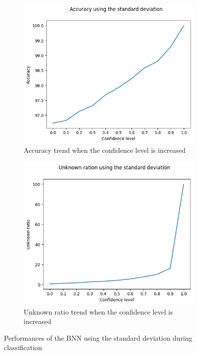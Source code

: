 \begin{figure}[h]
	\centering
	\begin{subfigure}{.5\textwidth}
		\centering
		\includegraphics[width=0.8\linewidth]{ImageFiles/ClassifUncer/std_acc}
		\caption{Accuracy trend when the confidence level is increased}
		\label{fig:std_acc}
	\end{subfigure}%
	\begin{subfigure}{.5\textwidth}
		\centering
		\includegraphics[width=0.8\linewidth]{ImageFiles/ClassifUncer/std_unk}
		\caption{Unknown ratio trend when the confidence level is increased}
		\label{fig:std_unk}
	\end{subfigure}
	\caption{Performances of the BNN using the standard deviation during classification}
	\label{fig:std_class}
\end{figure}